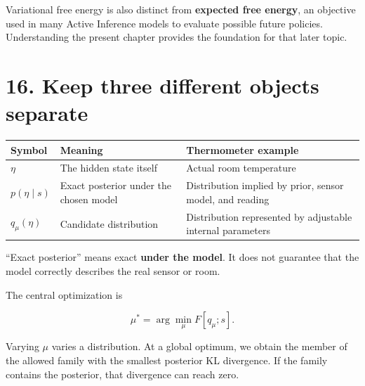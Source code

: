 \documentclass[
  letterpaper,
  DIV=11,
  numbers=noendperiod]{scrreprt}
\newcounter{none} %
\begin{document}
Variational free energy is also distinct from \textbf{expected free
energy}, an objective used in many Active Inference models to evaluate
possible future policies. Understanding the present chapter provides the
foundation for that later topic.

\section{16. Keep three different objects
separate}\label{keep-three-different-objects-separate}

{\def\LTcaptype{none} %
\begin{longtable}[]{@{}
  >{\raggedright\arraybackslash}p{}
  >{\raggedright\arraybackslash}p{}
  >{\raggedright\arraybackslash}p{}@{}}
\toprule\noalign{}
\begin{minipage}[b]{\linewidth}\raggedright
Symbol
\end{minipage} & \begin{minipage}[b]{\linewidth}\raggedright
Meaning
\end{minipage} & \begin{minipage}[b]{\linewidth}\raggedright
Thermometer example
\end{minipage} \\
\midrule\noalign{}
\endhead
\bottomrule\noalign{}
\endlastfoot
\(\eta\) & The hidden state itself & Actual room temperature \\
\(p(\eta\mid s)\) & Exact posterior under the chosen model &
Distribution implied by prior, sensor model, and reading \\
\(q_\mu(\eta)\) & Candidate distribution & Distribution represented by
adjustable internal parameters \\
\end{longtable}
}

``Exact posterior'' means exact \textbf{under the model}. It does not
guarantee that the model correctly describes the real sensor or room.

The central optimization is

\[
\boxed{
\mu^*=\arg\min_\mu F[q_\mu;s].
}
\]

Varying \(\mu\) varies a distribution. At a global optimum, we obtain
the member of the allowed family with the smallest posterior KL
divergence. If the family contains the posterior, that divergence can
reach zero.
\end{document}
